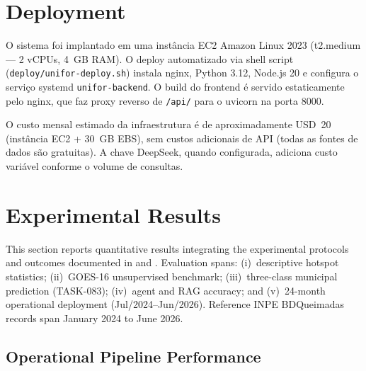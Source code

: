 \documentclass[preprint,times,numbers]{elsarticle}
\begin{document}
\section{Deployment}
\label{sec:deploy}

O sistema foi implantado em uma instância EC2 Amazon Linux 2023 (t2.medium --- 2 vCPUs, 4~GB RAM). O deploy automatizado via shell script (\texttt{deploy/unifor-deploy.sh}) instala nginx, Python 3.12, Node.js 20 e configura o serviço systemd \texttt{unifor-backend}. O build do frontend é servido estaticamente pelo nginx, que faz proxy reverso de \texttt{/api/} para o uvicorn na porta 8000.

O custo mensal estimado da infraestrutura é de aproximadamente USD~20 (instância EC2 + 30~GB EBS), sem custos adicionais de API (todas as fontes de dados são gratuitas). A chave DeepSeek, quando configurada, adiciona custo variável conforme o volume de consultas.



\section{Experimental Results}
\label{sec:results}

This section reports quantitative results integrating the experimental protocols and outcomes documented in  and . Evaluation spans: (i)~descriptive hotspot statistics; (ii)~GOES-16 unsupervised benchmark; (iii)~three-class municipal prediction (TASK-083); (iv)~agent and RAG accuracy; and (v)~24-month operational deployment (Jul/2024--Jun/2026). Reference INPE BDQueimadas records span January 2024 to June 2026.



\subsection{Operational Pipeline Performance}
\label{sec:operational-pipeline}
\end{document}

